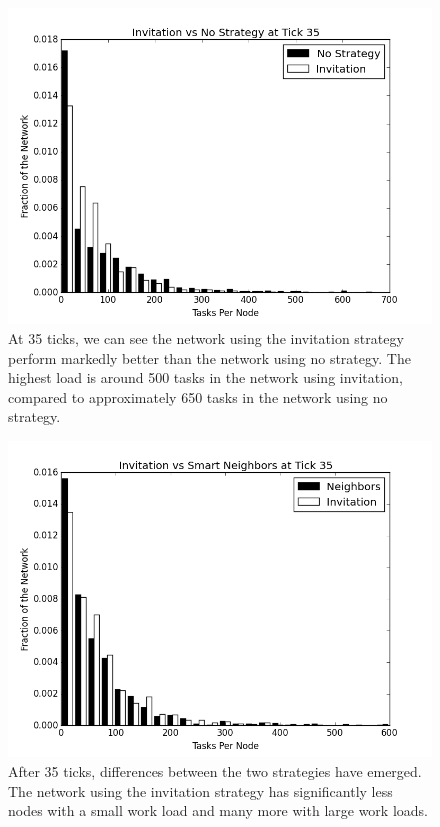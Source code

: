 \documentclass[10pt,conference]{IEEEtran}
\begin{document}
	\begin{figure}
		\centering
		\includegraphics[width=0.9\linewidth]{figs/inviteStableHist35}
		\caption[Invitiation vs no strategy after 35 ticks]{At 35 ticks, we can see the network using the invitation strategy perform markedly better than the network using no strategy. The highest load is around 500 tasks in the network using invitation, compared to approximately 650 tasks in the network using no strategy.}
		\label{fig:inviteStableHist35}
	\end{figure}
	
	
%	
%	
	
	\begin{figure}
		\centering
		\includegraphics[width=0.9\linewidth]{figs/inviteNeighborsHist35}
		\caption[Invitation vs smart neighbor injection after 35 ticks.]{After 35 ticks, differences between the two strategies have emerged.  The network using the invitation strategy has significantly less nodes with a small work load and many more with large work loads.}
		\label{fig:inviteNeighborsHist35}
	\end{figure}
	
\end{document}
